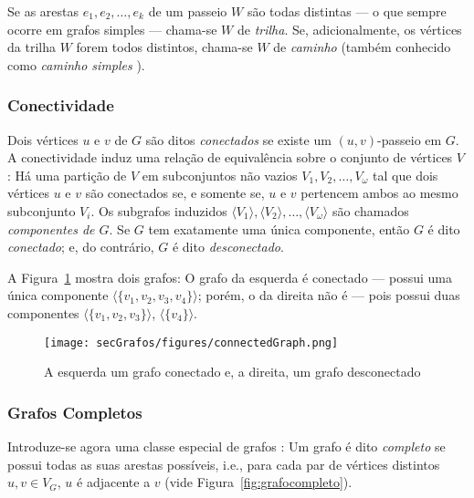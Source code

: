 Se as arestas $e_1,e_2,\dots,e_k$ de um passeio $W$ são todas distintas --- o que sempre ocorre em grafos simples --- chama-se $W$ de \textit{trilha}.  Se, adicionalmente, os vértices da trilha $W$ forem todos distintos, chama-se $W$ de \textit{caminho} (também conhecido como \textit{caminho simples} \cite{grafosPremioElon}).

\subsubsection{Conectividade}

Dois vértices $u$ e $v$ de $G$ são ditos \textit{conectados} se existe um $(u,v)$-passeio em $G$. A conectividade induz uma relação de equivalência sobre o conjunto de vértices $V$ \cite{graphTheoryApplicationsBondy}: Há uma partição de $V$ em subconjuntos não vazios $V_1, V_2, \dots, V_\omega$ tal que dois vértices $u$ e $v$ são conectados se, e somente se, $u$ e $v$ pertencem ambos ao mesmo subconjunto $V_i$. Os subgrafos induzidos $\langle V_1\rangle, \langle V_2\rangle, \dots,\langle V_\omega\rangle$ são chamados \textit{componentes de $G$}. Se $G$ tem exatamente uma única componente, então $G$ é dito \textit{conectado}; e, do contrário, $G$ é dito \textit{desconectado}. 

A Figura~\ref{fig:connectGraph} mostra dois grafos: O grafo da esquerda é conectado --- possui uma única componente $\langle \{v_1,v_2,v_3,v_4\}\rangle$; porém, o da direita não é --- pois possui duas componentes $\langle \{v_1,v_2,v_3\}\rangle$, $\langle \{v_4\}\rangle$.

\begin{figure}[H]
	\begin{center}
		\texttt{[image: secGrafos/figures/connectedGraph.png]}
	\end{center}
	\caption{A esquerda um grafo conectado e, a direita, um grafo desconectado}
	\label{fig:connectGraph}
\end{figure}


\subsubsection{Grafos Completos}

Introduze-se agora uma classe especial de grafos \cite{graphTheoryApplicationsBondy}: Um grafo é dito \textit{completo} se possui todas as suas arestas possíveis, i.e., para cada par de vértices distintos $u, v \in V_G$, $u$ é adjacente a $v$ (vide Figura~\ref{fig:grafocompleto}).

